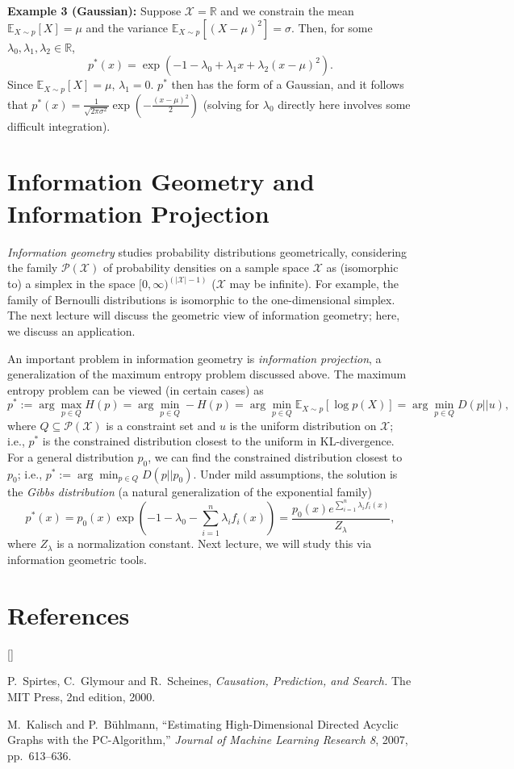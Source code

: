 \documentclass[twoside]{article}
\def\beginrefs{\begin{list}%
        {[\arabic{equation}]}{\usecounter{equation}
         \setlength{\leftmargin}{2.0truecm}\setlength{\labelsep}{0.4truecm}%
         \setlength{\labelwidth}{1.6truecm}}}
\def\endrefs{\end{list}}
\def\bibentry#1{\item[\hbox{[#1]}]}
\newcommand\E{\mathbb{E}}       %
\newcommand\Pds{\mathcal{P}}
\newcommand\R{\mathbb{R}}
\newcommand\X{\mathcal{X}}
\begin{document}
{\bf Example 3 (Gaussian):} Suppose $\X = \R$ and we constrain the mean
$\E_{X \sim p}[X] = \mu$ and the variance
$\E_{X \sim p}[(X - \mu)^2] = \sigma$. Then, for some
$\lambda_0,\lambda_1,\lambda_2 \in \R$,
\[p^*(x)
    = \exp\left( -1 - \lambda_0
                + \lambda_1 x + \lambda_2 (x - \mu)^2
        \right).
\]
Since $\E_{X \sim p}[X] = \mu$, $\lambda_1 = 0$. $p^*$ then has the form of a
Gaussian, and it follows that
$p^*(x)
    = \frac{1}{\sqrt{2\pi\sigma^2}} \exp\left( -\frac{(x - \mu)^2}{2} \right)$
(solving for $\lambda_0$ directly here involves some difficult integration).

\section{Information Geometry and Information Projection}

\emph{Information geometry} studies probability distributions geometrically,
considering the family $\Pds(\X)$ of probability densities on a sample space
$\X$ as (isomorphic to) a simplex in the space $[0,\infty)^{(|\X| - 1)}$ ($\X$
may be infinite). For example, the family of Bernoulli distributions is
isomorphic to the one-dimensional simplex. The next lecture will discuss the
geometric view of information geometry; here, we discuss an application.

An important problem in information geometry is \emph{information projection},
a generalization of the maximum entropy problem discussed above. The maximum
entropy problem can be viewed (in certain cases) as
\[p^*
    := \arg\max_{p \in Q} H(p)
    = \arg\min_{p \in Q} - H(p)
    = \arg\min_{p \in Q} \E_{X \sim p}[\log p(X)]
    = \arg\min_{p \in Q} D(p||u),
\]
where $Q \subseteq \Pds(\X)$ is a constraint set and $u$ is the uniform
distribution on $\X$; i.e., $p^*$ is the constrained distribution closest to
the uniform in KL-divergence. For a general distribution $p_0$, we can find
the constrained distribution closest to $p_0$; i.e.,
$p^* := \arg\min_{p \in Q} D(p||p_0)$. Under mild assumptions, the solution is
the \emph{Gibbs distribution} (a natural generalization of the exponential
family)
\[p^*(x)
    = p_0(x) \exp\left( -1 - \lambda_0 - \sum_{i = 1}^n \lambda_i f_i(x) \right)
    = \frac{p_0(x)e^{\sum_{i = 1}^n \lambda_i f_i(x)}}{Z_\lambda},
\]
where $Z_\lambda$ is a normalization constant. Next lecture, we will study this
via information geometric tools.

\section*{References}
\beginrefs
\bibentry{PC00}{\sc P.~Spirtes}, {\sc C.~Glymour} and {\sc R.~Scheines}, 
{\it Causation, Prediction, and Search.} The MIT Press, 2nd edition, 2000.
\bibentry{KB07}{\sc M.~Kalisch} and {\sc P.~B\"uhlmann}, 
``Estimating High-Dimensional Directed Acyclic Graphs with the PC-Algorithm,''
{\it Journal of Machine Learning Research 8}, 2007, pp.~613--636.
\endrefs
\end{document}
